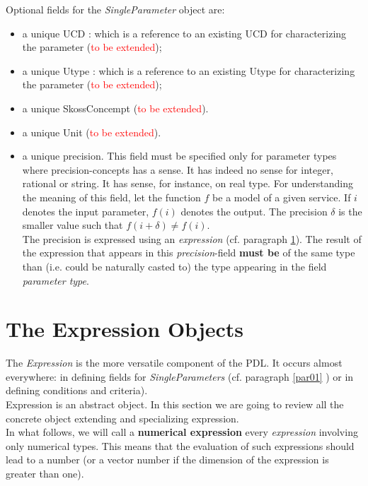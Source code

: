 \documentclass[11pt]{amsart}
\begin{document}
Optional fields for the {\it SingleParameter} object are:
\begin{itemize}
\item a unique UCD : which is a reference to an existing UCD for characterizing the parameter (\textcolor{red}{to be extended});
\item a unique Utype  : which is a reference to an existing Utype for characterizing the parameter (\textcolor{red}{to be extended});
\item a unique SkossConcempt (\textcolor{red}{to be extended}).
\item a unique Unit (\textcolor{red}{to be extended}).
\item a unique precision. This field must be specified only for parameter types where precision-concepts has a sense. It has indeed no sense for integer, rational or string. It has sense, for instance, on real type. For understanding the meaning of this field, let the function $f$ be a model of a given service. If $i$ denotes the input parameter, $f(i)$ denotes the output. The precision $\delta$ is the smaller value such that $f(i+\delta) \neq f(i)$.\\ The precision is expressed using an {\it expression} (cf. paragraph \ref{par02}). The result of the expression that appears in this {\it precision}-field  {\bf must be} of the same type than (i.e. could be naturally casted to) the type appearing in the field {\it parameter type}.
\end{itemize}

\section{The Expression Objects}\label{par02}
The {\it Expression} is the more versatile component of the PDL. It occurs almost everywhere: in defining fields for {\it SingleParameters} (cf. paragraph \ref{par01} ) or in defining conditions and criteria).\\
Expression is an abstract object. In this section we are going to review all the concrete object extending and specializing expression.\\

 In what follows, we will call a {\bf numerical expression} every {\it expression} involving only numerical types. This means that the evaluation of such expressions should lead to a number (or a vector number if the dimension of the expression is greater than one).\\
\end{document}
